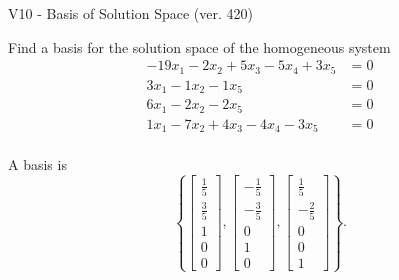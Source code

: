 \begin{exercise}
  \begin{exerciseTitle}V10 - Basis of Solution Space (ver. 420)\end{exerciseTitle}
  \begin{exerciseStatement}
    Find a basis for the solution space of the homogeneous system 
\begin{align*}
 -19 x_ 1 -2 x_ 2 + 5 x_ 3 -5 x_ 4 + 3 x_ 5 &= 0  \\ 
  3 x_ 1 -1 x_ 2 -1 x_ 5 &= 0  \\ 
  6 x_ 1 -2 x_ 2 -2 x_ 5 &= 0  \\ 
  1 x_ 1 -7 x_ 2 + 4 x_ 3 -4 x_ 4 -3 x_ 5 &= 0  \\ 
 \end{align*}


 
  \end{exerciseStatement}

  \begin{exerciseAnswer}
   A basis is   
\[\left\{\left[\begin{array}{c}
\frac{1}{5} \\
\frac{3}{5} \\
1 \\
0 \\
0
\end{array}\right] , \left[\begin{array}{c}
-\frac{1}{5} \\
-\frac{3}{5} \\
0 \\
1 \\
0
\end{array}\right] , \left[\begin{array}{c}
\frac{1}{5} \\
-\frac{2}{5} \\
0 \\
0 \\
1
\end{array}\right]\right\}.\]

  


  \end{exerciseAnswer}
\end{exercise}